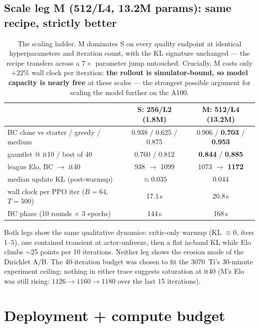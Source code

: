 \documentclass[11pt]{article}
\begin{document}
\subsection{Scale leg M (512/L4, 13.2M params): same recipe, strictly better}
\begin{table}[h]\centering\small
\begin{tabular}{@{}lcc@{}}
\toprule
 & S: 256/L2 (1.8M) & M: 512/L4 (13.2M) \\
\midrule
BC clone vs starter / greedy / medium & 0.938 / 0.625 / 0.875 & 0.906 / \textbf{0.703} / \textbf{0.953} \\
gauntlet @ it10 / best of 40          & 0.760 / 0.812         & \textbf{0.844} / \textbf{0.885} \\
league Elo, BC $\to$ it40             & 938 $\to$ 1099        & 1073 $\to$ \textbf{1172} \\
median update KL (post-warmup)        & $\approx 0.035$       & 0.044 \\
wall clock per PPO iter ($B{=}64$, $T{=}500$) & 17.1\,s        & 20.8\,s \\
BC phase (10 rounds $\times$ 3 epochs) & 144\,s               & 168\,s \\
\bottomrule
\end{tabular}
\caption{The scaling ladder. M dominates S on every quality endpoint at identical
hyperparameters and iteration count, with the KL signature unchanged --- the recipe transfers
across a $7\times$ parameter jump untouched. Crucially, M costs only $+22\%$ wall clock per
iteration: \textbf{the rollout is simulator-bound, so model capacity is nearly free} at these
scales --- the strongest possible argument for scaling the model further on the A100.}
\label{tab:ladder}
\end{table}

\noindent Both legs show the same qualitative dynamics: critic-only warmup (KL $\equiv 0$,
iters 1--5), one contained transient at actor-unfreeze, then a flat in-band KL while Elo climbs
$\sim$25 points per 10 iterations. Neither leg shows the erosion mode of the Dirichlet A/B. The
40-iteration budget was chosen to fit the 3070~Ti's 30-minute experiment ceiling; nothing in
either trace suggests saturation at it40 (M's Elo was still rising: $1126 \to 1160 \to 1180$
over the last 15 iterations).

\section{Deployment + compute budget}\label{v7:budget}
\end{document}
